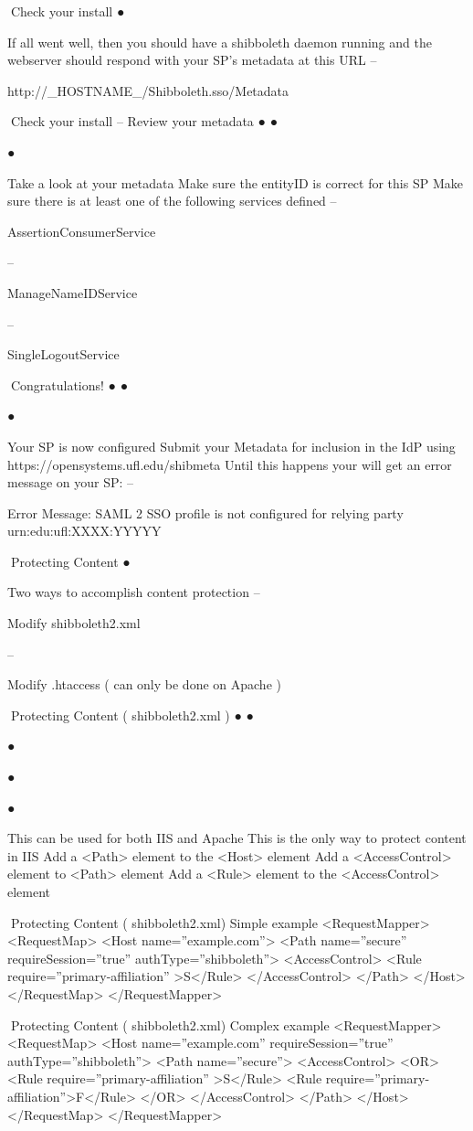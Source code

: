 Check your install
●

If all went well, then you should have a
shibboleth daemon running and the
webserver should respond with your
SP's metadata at this URL
–

http://_HOSTNAME_/Shibboleth.sso/Metadata

Check your install – Review your
metadata
●
●

●

Take a look at your metadata
Make sure the entityID is correct for this
SP
Make sure there is at least one of the
following services defined
–

AssertionConsumerService

–

ManageNameIDService

–

SingleLogoutService

Congratulations!
●
●

●

Your SP is now configured
Submit your Metadata for inclusion in the
IdP using https://opensystems.ufl.edu/shibmeta
Until this happens your will get an error
message on your SP:
–

Error Message: SAML 2 SSO profile is not
configured for relying party
urn:edu:ufl:XXXX:YYYYY

Protecting Content
●

Two ways to accomplish content
protection
–

Modify shibboleth2.xml

–

Modify .htaccess ( can only be done on
Apache )

Protecting Content
( shibboleth2.xml )
●
●

●

●

●

This can be used for both IIS and Apache
This is the only way to protect content in
IIS
Add a <Path> element to the <Host>
element
Add a <AccessControl> element to <Path>
element
Add a <Rule> element to the
<AccessControl> element

Protecting Content
( shibboleth2.xml)
Simple example
<RequestMapper>
<RequestMap>
<Host name=”example.com”>
<Path name=”secure” requireSession=”true” authType=”shibboleth”>
<AccessControl>
<Rule require=”primary-affiliation” >S</Rule>
</AccessControl>
</Path>
</Host>
</RequestMap>
</RequestMapper>

Protecting Content
( shibboleth2.xml)
Complex example
<RequestMapper>
<RequestMap>
<Host name=”example.com” requireSession=”true” authType=”shibboleth”>
<Path name=”secure”>
<AccessControl>
<OR>
<Rule require=”primary-affiliation” >S</Rule>
<Rule require=”primary-affiliation”>F</Rule>
</OR>
</AccessControl>
</Path>
</Host>
</RequestMap>
</RequestMapper>

